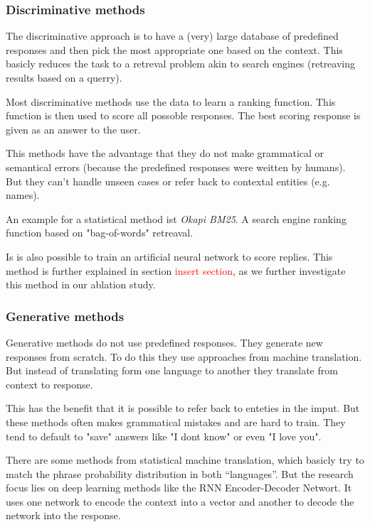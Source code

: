 \documentclass[conference]{IEEEtran}
\newcommand\note[1]{\textcolor{red}{#1}}
\begin{document}
\subsubsection{Discriminative methods}
The discriminative approach is to have a (very) large database of predefined responses and then pick the most appropriate one based on the context. This basicly reduces the task to a retreval problem akin to search engines (retreaving results based on a querry).

Most discriminative methods use the data to learn a ranking function. This function is then used to score all possoble responses. The best scoring response is given as an answer to the user.\cite{yan2016shall}

This methods have the advantage that they do not make grammatical or semantical errors (because the predefined responses were weitten by humans). But they can't handle unseen cases or refer back to contextal entities (e.g. names).

An example for a statistical method ist \emph{Okapi BM25}\cite{manning2008introduction}. A search engine ranking function based on "bag-of-words" retreaval.

Is is also possible to train an artificial neural network to score replies\cite{yan2016shall,lowe2015ubuntu}. This method is further explained in section \note{insert section}, as we further investigate this method in our ablation study.

\subsubsection{Generative methods}
Generative methods do not use predefined responses. They generate new responses from scratch. To do this they use approaches from machine translation. But instead of translating form one language to another they translate from context to response.

This has the benefit that it is possible to refer back to enteties in the imput. But these methods often makes grammatical mistakes and are hard to train. They tend to default to "save" answers like "I dont know" or even "I love you".\

There are some methods from statistical machine translation, which basicly try to match the phrase probability distribution in both “languages”. But the research focus lies on deep learning methods like the RNN Encoder-Decoder Networt\cite{sutskever2014sequence}. It uses one network to encode the context into a vector and another to decode the network into the response.
\end{document}
